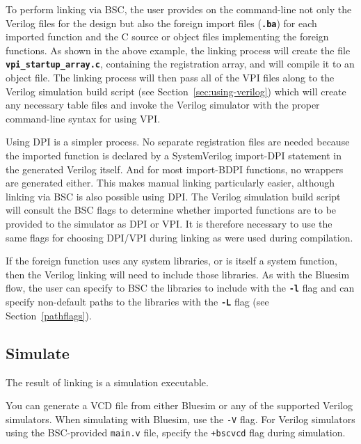 \documentclass{article}
\newcommand{\te}[1]{\texttt{#1}}
\begin{document}
To perform linking via BSC, the user provides on the command-line not
only the Verilog files for the design but also the foreign import files
({\bf\tt .ba}) for each imported function and the C source or object files
implementing the foreign functions.  As shown in the above example,
the linking process will create the file {\bf\tt vpi\_startup\_array.c},
containing the registration array, and will compile it to an object file.
The linking process will then pass all of the VPI files along to the
Verilog simulation build script (see Section~\ref{sec:using-verilog})
which will create any necessary table files and invoke the Verilog
simulator with the proper command-line syntax for using VPI.

Using DPI is a simpler process.  No separate registration files are
needed because the imported function is declared by a
SystemVerilog import-DPI statement in the generated Verilog itself.
And for most import-BDPI functions, no wrappers are generated either.
This makes manual linking particularly easier, although linking via
BSC is also possible using DPI.  The Verilog simulation build script
will consult the BSC flags to determine whether imported functions are
to be provided to the simulator as DPI or VPI.
It is therefore necessary to use the same flags for choosing DPI/VPI
during linking as were used during compilation.

If the foreign function uses any system libraries, or is itself a
system function, then the Verilog linking will need to include those
libraries.  As with the Bluesim flow, the user can specify to BSC
the libraries to include with the {\bf\tt -l} flag and can specify
non-default paths to the libraries with the {\bf\tt -L} flag
(see Section~\ref{pathflags}).\index{-L@\te{-L} (compiler flag)}
\index{-l@\te{-l} (compiler flag)}


\subsection{Simulate}
\label{simulate}

The result of linking is a simulation executable.

You can generate a VCD file from either Bluesim or any of the
 supported Verilog simulators.  When simulating with Bluesim, use
 the \te{-V} flag.   For Verilog simulators using
the BSC-provided \te{main.v} file, specify the \te{+bscvcd} flag during
simulation.
\end{document}
